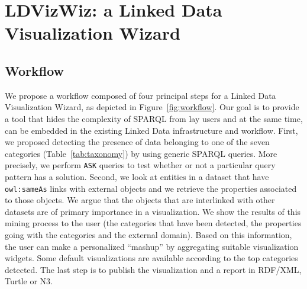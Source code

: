 \section{LDVizWiz: a Linked Data Visualization Wizard}
\label{sec:ldvizwiz}

\subsection{Workflow}
\label{sec:wizard-wflow}
We propose a workflow composed of four principal steps for a Linked Data Visualization Wizard, as depicted in Figure~\ref{fig:workflow}. Our goal is to provide a tool that hides the complexity of SPARQL from lay users and at the same time, can be embedded in the existing Linked Data infrastructure and workflow. First, we proposed detecting the presence of data belonging to one of the seven categories (Table~\ref{tab:taxonomy}) by using generic SPARQL queries. More precisely, we perform \texttt{ASK} queries to test whether or not a particular query pattern has a solution. Second, we look at entities in a dataset that have \texttt{owl:sameAs} links with external objects and we retrieve the properties associated to those objects. We argue that the objects that are interlinked with other datasets are of primary importance in a visualization. We show the results of this mining process to the user (the categories that have been detected, the properties going with the categories and the external domain). Based on this information, the user can make a personalized ``mashup'' by aggregating suitable visualization widgets. Some default visualizations are available according to the top categories detected. The last step is to publish the visualization and a report in RDF/XML, Turtle or N3.

